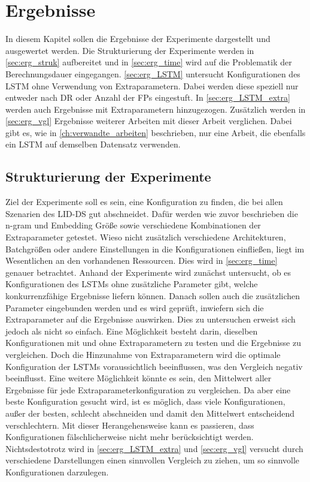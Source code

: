 \chapter{Ergebnisse}\label{ch:erg}

In diesem Kapitel sollen die Ergebnisse der Experimente dargestellt und ausgewertet werden.
Die Strukturierung der Experimente werden in \autoref{sec:erg_struk} aufbereitet und in \autoref{sec:erg_time} wird auf die Problematik der Berechnungsdauer eingegangen.
\autoref{sec:erg_LSTM} untersucht Konfigurationen des \ac{LSTM} ohne Verwendung von Extraparametern.
Dabei werden diese speziell nur entweder nach \ac{DR} oder Anzahl der \acp{FP} eingestuft.
In \autoref{sec:erg_LSTM_extra} werden auch Ergebnisse mit Extraparametern hinzugezogen.
Zusätzlich werden in \autoref{sec:erg_vgl} Ergebnisse weiterer Arbeiten mit dieser Arbeit verglichen.
Dabei gibt es, wie in \autoref{ch:verwandte_arbeiten} beschrieben, nur eine Arbeit, die ebenfalls ein \ac{LSTM} auf demselben Datensatz verwenden.

\section{Strukturierung der Experimente}\label{sec:erg_struk}
    Ziel der Experimente soll es sein, eine Konfiguration zu finden, die bei allen Szenarien des \ac{LID-DS} gut abschneidet.
    Dafür werden wie zuvor beschrieben die n-gram und Embedding Größe sowie verschiedene Kombinationen der Extraparameter getestet. 
    Wieso nicht zusätzlich verschiedene Architekturen, Batchgrößen oder andere Einstellungen in die Konfigurationen einfließen, liegt im Wesentlichen an den vorhandenen Ressourcen.
    Dies wird in \autoref{sec:erg_time} genauer betrachtet.
    Anhand der Experimente wird zunächst untersucht, ob es Konfigurationen des \acp{LSTM} ohne zusätzliche Parameter gibt, welche konkurrenzfähige Ergebnisse liefern können.
    Danach sollen auch die zusätzlichen Parameter eingebunden werden und es wird geprüft, inwiefern sich die Extraparameter auf die Ergebnisse auswirken.
    Dies zu untersuchen erweist sich jedoch als nicht so einfach.
    Eine Möglichkeit besteht darin, dieselben Konfigurationen mit und ohne Extraparametern zu testen und die Ergebnisse zu vergleichen.
    Doch die Hinzunahme von Extraparametern wird die optimale Konfiguration der \acp{LSTM} voraussichtlich beeinflussen, was den Vergleich negativ beeinflusst.
    Eine weitere Möglichkeit könnte es sein, den Mittelwert aller Ergebnisse für jede Extraparameterkonfiguration zu vergleichen.
    Da aber eine beste Konfiguration gesucht wird, ist es möglich, dass viele Konfigurationen, außer der besten, schlecht abschneiden und damit den Mittelwert entscheidend verschlechtern.
    Mit dieser Herangehensweise kann es passieren, dass Konfigurationen fälschlicherweise nicht mehr berücksichtigt werden.
    Nichtsdestotrotz wird in \autoref{sec:erg_LSTM_extra} und \autoref{sec:erg_vgl} versucht durch verschiedene Darstellungen einen sinnvollen Vergleich zu ziehen, um so sinnvolle Konfigurationen darzulegen.

